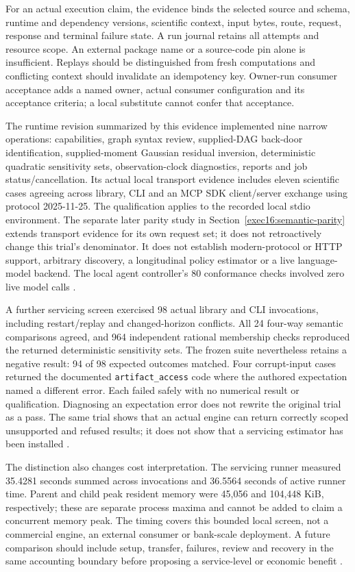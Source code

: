 For an actual execution claim, the evidence binds the selected source and
schema, runtime and dependency versions, scientific context, input bytes,
route, request, response and terminal failure state. A run journal retains all
attempts and resource scope. An external package name or a source-code pin alone
is insufficient. Replays should be distinguished from fresh computations and
conflicting context should invalidate an idempotency key. Owner-run consumer
acceptance adds a named owner, actual consumer configuration and its acceptance
criteria; a local substitute cannot confer that acceptance.

The runtime revision summarized by this evidence implemented nine narrow operations: capabilities,
graph syntax review, supplied-DAG back-door identification, supplied-moment
Gaussian residual inversion, deterministic quadratic sensitivity sets,
observation-clock diagnostics, reports and job status/cancellation. Its actual
local transport evidence includes eleven scientific cases agreeing across
library, CLI and an MCP SDK client/server exchange using protocol 2025-11-25.
The qualification applies to the recorded local stdio environment. The separate later parity study in Section~\ref{exec16:semantic-parity} extends transport evidence for its own request set; it does not retroactively change this trial's denominator. It does not
establish modern-protocol or HTTP support, arbitrary discovery, a longitudinal
policy estimator or a live language-model backend. The local agent controller's
80 conformance checks involved zero live model calls
\citep{exec14_execution_evidence}.

A further servicing screen exercised 98 actual library and CLI invocations,
including restart/replay and changed-horizon conflicts. All 24 four-way semantic
comparisons agreed, and 964 independent rational membership checks reproduced
the returned deterministic sensitivity sets. The frozen suite nevertheless
retains a negative result: 94 of 98 expected outcomes matched. Four corrupt-input
cases returned the documented \texttt{artifact\_access} code where the authored
expectation named a different error. Each failed safely with no numerical
result or qualification. Diagnosing an expectation error does not rewrite the
original trial as a pass. The same trial shows that an actual engine can return
correctly scoped unsupported and refused results; it does not show that a
servicing estimator has been installed \citep{exec14_servicing_evidence}.

The distinction also changes cost interpretation. The servicing runner measured
35.4281 seconds summed across invocations and 36.5564 seconds of active runner
time. Parent and child peak resident memory were 45,056 and 104,448 KiB,
respectively; these are separate process maxima and cannot be added to claim a
concurrent memory peak. The timing covers this bounded local screen, not a
commercial engine, an external consumer or bank-scale deployment. A future
comparison should include setup, transfer, failures, review and recovery in the
same accounting boundary before proposing a service-level or economic benefit
\citep{exec14_servicing_evidence}.

